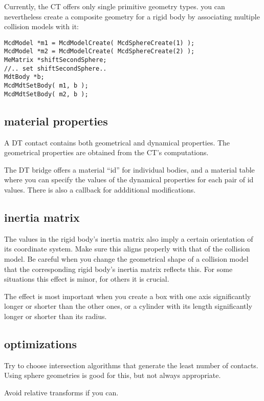 \documentclass[11pt]{article}
\begin{document}
Currently, the CT offers only single primitive geometry types. you can
nevertheless create a composite geometry for a rigid body by associating
multiple collision models with it:
\begin{verbatim}
McdModel *m1 = McdModelCreate( McdSphereCreate(1) );
McdModel *m2 = McdModelCreate( McdSphereCreate(2) );
MeMatrix *shiftSecondSphere;
//.. set shiftSecondSphere..
MdtBody *b;
McdMdtSetBody( m1, b );
McdMdtSetBody( m2, b );
\end{verbatim}

\subsection{ material properties }

A DT contact contains both geometrical and dynamical properties.
The geometrical properties are obtained from the CT's computations. 

The DT bridge offers a material ``id'' for individual bodies, and a
material table where you can specify the values of the dynamical properties
for each pair of id values. There is also a callback for addditional
modifications.

\subsection{ inertia matrix }

The values in the rigid body's inertia matrix also imply a certain
orientation of its coordinate system. Make sure this aligns properly with
that of the collision model.
 Be careful when you change the geometrical shape of a collision model that
 the corresponding rigid body's inertia matrix reflects this. For some
 situations this effect is minor, for others it is crucial.

The effect is most important when you create a box with one axis
significantly longer or shorter than the other ones, or a cylinder with its
length significantly longer or shorter than its radius.

\subsection{ optimizations }


Try to choose intersection algorithms that generate the least number of
contacts. Using sphere geometries is good for this, but not always
appropriate.

Avoid relative transforms if you can.
\end{document}
